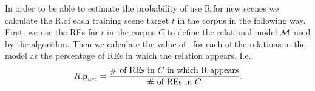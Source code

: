 





In order to be able to estimate the probability of use R.\puse for new scenes we calculate the R.\puse of each training scene target $t$ in the corpus in the following way.
First, we use the REs for $t$ in the corpus $C$ to define the relational model $\mathcal{M}$
used by the algorithm.  
Then we calculate the value of \puse\ for each of the relations in the model as the percentage of REs in which the relation appears.  I.e., 
\begin{equation}\label{eq1}
R.\textsf{p}_\textit{use} = \frac{\# \mbox{ of REs in $C$ in which R appears}}{\# \mbox{ of REs in $C$}}.
\end{equation}

